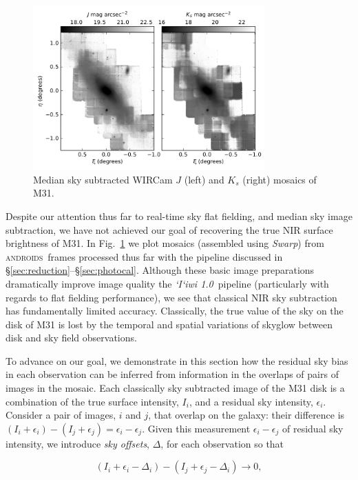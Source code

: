 \documentclass[iop]{emulateapj}
\newcommand{\sw}[1]{\textit{#1}} %
\newcommand{\iiwione}{\sw{`I`iwi 1.0}}
\newcommand{\androids}{\textsc{androids}}
\newcommand{\Fig}[1]{Fig.~\ref{fig:#1}}  %
\newcommand{\Sec}[1]{\S\ref{sec:#1}}  %
\begin{document}
\begin{figure}[t]
\centering
\includegraphics[width=3.5in]{figs/raw_mosaics}
\caption{Median sky subtracted WIRCam $J$ (left) and $K_s$ (right) mosaics of M31.}
\label{fig:raw_mosaics}
\end{figure}

Despite our attention thus far to real-time sky flat fielding, and median sky image subtraction, we have not achieved our goal of recovering the true NIR surface brightness of M31.
In \Fig{raw_mosaics} we plot mosaics (assembled using \sw{Swarp}) from \androids\ frames processed thus far with the pipeline discussed in \Sec{reduction}--\Sec{photocal}.
Although these basic image preparations dramatically improve image quality the \iiwione\ pipeline (particularly with regards to flat fielding performance), we see that classical NIR sky subtraction has fundamentally limited accuracy.
Classically, the true value of the sky on the disk of M31 is lost by the temporal and spatial variations of skyglow between disk and sky field observations.

To advance on our goal, we demonstrate in this section how the residual sky bias in each observation can be inferred from information in the overlaps of pairs of images in the mosaic.
Each classically sky subtracted image of the M31 disk is a combination of the true surface intensity, $I_i$, and a residual sky intensity, $\epsilon_i$.
Consider a pair of images, $i$ and $j$, that overlap on the galaxy: their difference is $(I_i+\epsilon_i) - (I_j+\epsilon_j) = \epsilon_i - \epsilon_j$.
Given this measurement $\epsilon_i - \epsilon_j$ of residual sky intensity, we introduce \emph{sky offsets}, $\Delta$, for each observation so that

\begin{equation}
    (I_i + \epsilon_i - \Delta_i) - (I_j + \epsilon_j - \Delta_i) \rightarrow 0,
\end{equation}
\end{document}

